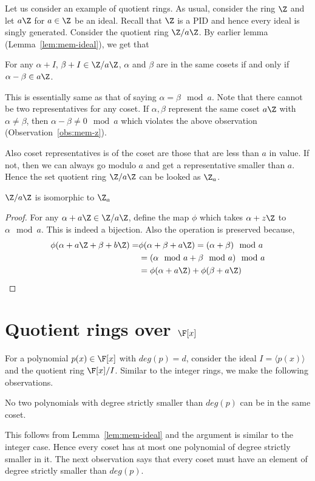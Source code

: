 Let us consider an example of quotient rings. As usual, consider the ring $\Z$
and let $a\Z$ for $a \in \Z$ be an ideal. Recall that $\Z$ is a PID and hence
every ideal is singly generated. Consider the quotient ring $\Z/a\Z$. 
By earlier lemma (Lemma~\ref{lem:mem-ideal}), we get that 
\begin{observation} \label{obs:mem-z}
	For any $\alpha + I$, $\beta + I \in \Z/a\Z$, $\alpha$ and $\beta$
	are in the same cosets if and only if $\alpha - \beta \in a\Z$. 
\end{observation}
This is essentially same as that of saying $\alpha = \beta \mod a$. 
Note that there cannot be two representatives for any coset. If $\alpha,
\beta$ represent the same coset $a\Z$ with $\alpha \ne \beta$, then
$\alpha-\beta \ne 0 \mod a$ which violates the above observation
(Observation~\ref{obs:mem-z}).

Also coset representatives is of the coset are those that are less than
$a$ in value. If not, then we can always go modulo $a$ and get a
representative smaller than $a$. Hence the set quotient ring $\Z/a\Z$ can be
looked as $\Z_a$.
\begin{claim}
	$\Z/a\Z$ is isomorphic to $\Z_a$
\end{claim}
\begin{proof}
	For any $\alpha + a\Z \in \Z/a\Z$, define the map $\phi$ which takes
	$\alpha + z\Z$ to $\alpha \mod a$. This is indeed a bijection.  
	Also the operation is preserved because,
	\begin{align*}
		\phi(\alpha + a\Z + \beta +b\Z) = & \phi(\alpha + \beta +a\Z)
		= (\alpha + \beta) \mod a \\ 
		& = (\alpha \mod a + \beta \mod a ) \mod a \\
		& = \phi(\alpha + a\Z) + \phi(\beta +a\Z)
	\end{align*}
\end{proof}

\section{Quotient rings over $\F[x]$}
For a polynomial $p(x) \in \F[x]$ with $deg(p) = d$, consider the ideal $I =
\langle p(x) \rangle$ and the quotient ring $\F[x]/I$. Similar to the integer
rings, we make the following observations.

\begin{observation}
	No two polynomials with degree strictly smaller than $deg(p)$ can be
	in the same coset. 
\end{observation}
This follows from Lemma~\ref{lem:mem-ideal} and the argument is similar to the
integer case. Hence every coset has at most one polynomial of degree strictly
smaller in it. The next observation says that every coset must have an element
of degree strictly smaller than $deg(p)$.

